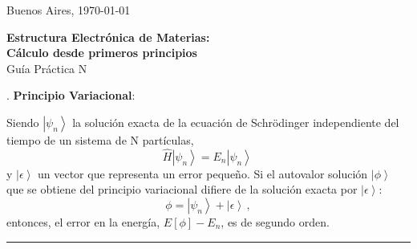 \documentclass[10pt]{article}
\begin{document}
\hfill{Buenos Aires, \today} \\

\begin{center}
 {\large \bf Estructura Electrónica de Materias: \\
 Cálculo desde primeros principios} \\
 
 \vspace{0.25cm}
 Guía Práctica N
\end{center}

\vspace{0.5cm}
. {\bf Principio Variacional}:

\vspace{0.25cm}
Siendo $\left|\psi_n\right>$ la solución exacta de la ecuación de Schr\"odinger
independiente del tiempo de un sistema de N partículas,
\begin{equation}
 \hat{H}\left|\psi_n\right> = E_n\left|\psi_n\right>\,
\end{equation}
y $\left|\epsilon\right>$ un vector que representa un error pequeño.
Si el autovalor solución $\left|\phi\right>$ que se obtiene del 
principio variacional difiere de la solución exacta por $\left|\epsilon\right>$: 
\begin{equation}
 \phi=\left|\psi_n\right>+\left|\epsilon\right>\,,
\end{equation}
entonces, el error en la energía, $E[\phi]-E_n$, es de segundo orden.

\begin{center}
 \noindent\rule[0.5ex]{0.9\linewidth}{0.1pt}
\end{center}
\end{document}
